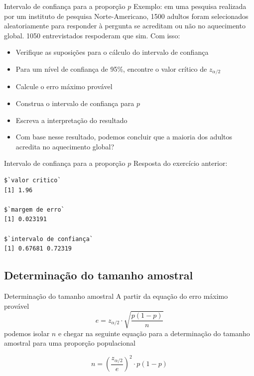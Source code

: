 \documentclass[10pt]{beamer}\usepackage[]{graphicx}\usepackage[]{color}
\makeatletter
\newenvironment{kframe}{%
 \def\at@end@of@kframe{}%
 \ifinner\ifhmode%
  \def\at@end@of@kframe{\end{minipage}}%
  \begin{minipage}{\columnwidth}%
 \fi\fi%
 \def\FrameCommand##1{\hskip\@totalleftmargin \hskip-\fboxsep
 \colorbox{shadecolor}{##1}\hskip-\fboxsep
     \hskip-\linewidth \hskip-\@totalleftmargin \hskip\columnwidth}%
 \MakeFramed {\advance\hsize-\width
   \@totalleftmargin\z@ \linewidth\hsize
   \@setminipage}}%
 {\par\unskip\endMakeFramed%
 \at@end@of@kframe}
\newenvironment{knitrout}{}{} %
\theoremstyle{definition}
\makeatother
\begin{document}
\begin{frame}{Intervalo de confiança para a proporção $p$}
  Exemplo: em uma pesquisa realizada por um instituto de pesquisa
  Norte-Americano, 1500 adultos foram selecionados aleatoriamente para
  responder à pergunta se acreditam ou não no aquecimento global. 1050
  entrevistados respoderam que sim. Com isso:
  \begin{itemize}
  \item[a)] Verifique as suposições para o cálculo do intervalo de confiança
  \item[b)] Para um nível de confiança de 95\%, encontre o valor crítico
    de $z_{\alpha/2}$
  \item[c)] Calcule o erro máximo provável
  \item[d)] Construa o intervalo de confiança para $p$
  \item[e)] Escreva a interpretação do resultado
  \item[f)] Com base nesse resultado, podemos concluir que a maioria dos
    adultos acredita no aquecimento global?
  \end{itemize}
\end{frame}

\begin{frame}[fragile]{Intervalo de confiança para a proporção $p$}
Resposta do exercício anterior:
\begin{knitrout}\footnotesize
{}\color{fgcolor}\begin{kframe}
\begin{verbatim}
$`valor critico`
[1] 1.96

$`margem de erro`
[1] 0.023191

$`intervalo de confiança`
[1] 0.67681 0.72319
\end{verbatim}
\end{kframe}
\end{knitrout}
\end{frame}

\subsection{Determinação do tamanho amostral}

\begin{frame}{Determinação do tamanho amostral}
  A partir da equação do erro máximo provável
  \begin{equation*}
    e = z_{\alpha/2} \cdot \sqrt{\frac{p(1-p)}{n}}
  \end{equation*}
  podemos isolar $n$ e chegar na seguinte equação para a determinação do
  tamanho amostral para uma proporção populacional

  \begin{equation*}
    n = \left( \frac{z_{\alpha/2}}{e} \right)^2 \cdot p(1-p)
  \end{equation*}
\end{frame}
\end{document}
